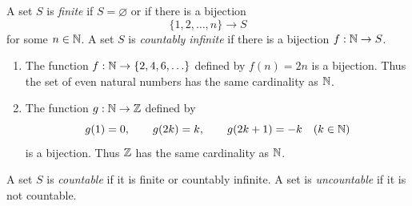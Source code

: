 \begin{definition}\label{def:finite-countable}
    A set $S$ is \emph{finite} if $S=\varnothing$ or if there is a bijection
    \[
        \{1,2,\ldots,n\}\to S
    \]
    for some $n\in\mathbb{N}$. A set $S$ is \emph{countably infinite} if there is a bijection $f:\mathbb{N}\to S$.
\end{definition}
\begin{example}
    \leavevmode
    \begin{enumerate}[label = (\alph*)]
        \item The function $f:\mathbb{N}\to\{2,4,6,\ldots\}$ defined by $f(n)=2n$ is a bijection. Thus the set of even natural numbers has the same cardinality as $\mathbb{N}$.
        \item The function $g:\mathbb{N}\to\mathbb{Z}$ defined by
        \[
            g(1)=0,\qquad g(2k)=k,\qquad g(2k+1)=-k \quad (k\in\mathbb{N})
        \]
        is a bijection. Thus $\mathbb{Z}$ has the same cardinality as $\mathbb{N}$.
    \end{enumerate}
\end{example}
\begin{definition}\label{def:countable-uncountable}
    A set $S$ is \emph{countable} if it is finite or countably infinite. A set is \emph{uncountable} if it is not countable.
\end{definition}
